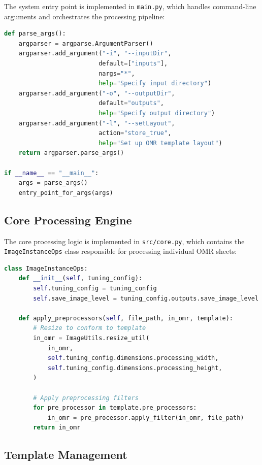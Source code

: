The system entry point is implemented in \texttt{main.py}, which handles command-line arguments and orchestrates the processing pipeline:

\begin{lstlisting}[language=Python, caption=Main Entry Point Implementation]
def parse_args():
    argparser = argparse.ArgumentParser()
    argparser.add_argument("-i", "--inputDir", 
                          default=["inputs"],
                          nargs="*",
                          help="Specify input directory")
    argparser.add_argument("-o", "--outputDir", 
                          default="outputs",
                          help="Specify output directory")
    argparser.add_argument("-l", "--setLayout", 
                          action="store_true",
                          help="Set up OMR template layout")
    return argparser.parse_args()

if __name__ == "__main__":
    args = parse_args()
    entry_point_for_args(args)
\end{lstlisting}

\subsection{Core Processing Engine}

The core processing logic is implemented in \texttt{src/core.py}, which contains the \texttt{ImageInstanceOps} class responsible for processing individual OMR sheets:

\begin{lstlisting}[language=Python, caption=Core Processing Class]
class ImageInstanceOps:
    def __init__(self, tuning_config):
        self.tuning_config = tuning_config
        self.save_image_level = tuning_config.outputs.save_image_level

    def apply_preprocessors(self, file_path, in_omr, template):
        # Resize to conform to template
        in_omr = ImageUtils.resize_util(
            in_omr,
            self.tuning_config.dimensions.processing_width,
            self.tuning_config.dimensions.processing_height,
        )
        
        # Apply preprocessing filters
        for pre_processor in template.pre_processors:
            in_omr = pre_processor.apply_filter(in_omr, file_path)
        return in_omr
\end{lstlisting}

\subsection{Template Management}


